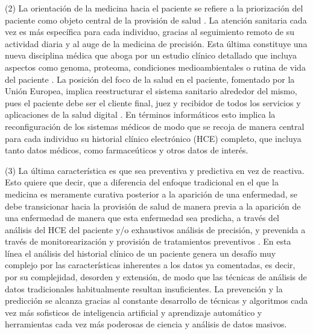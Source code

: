
(2) La orientación de la medicina hacia el paciente se refiere a la priorización del paciente como objeto central de la provisión de salud  \cite{tortorella2020healthcare}. La atención sanitaria cada vez es más específica para cada individuo, gracias al seguimiento remoto de su actividad diaria y al auge de la medicina de precisión. Esta última constituye una nueva disciplina médica que aboga por un estudio clínico detallado que incluya aspectos como genoma, proteoma, condiciones medioambientales o rutina de vida del paciente \cite{ruiz2023inteligencia}. La posición del foco de la salud en el paciente, fomentado por la Unión Europea,  implica reestructurar el sistema sanitario alrededor del mismo, pues el paciente debe ser el cliente final, juez y recibidor de todos los servicios y aplicaciones de la salud digital \cite{ntafi2022legal} \cite{katehakis2019framework}. En términos informáticos esto implica la reconfiguración de los sistemas médicos de modo que se recoja de manera central para cada individuo su historial clínico electrónico (HCE) completo, que incluya tanto datos médicos, como farmaceúticos y otros datos de interés.  



(3) La última característica es que sea preventiva y predictiva en vez de reactiva. Esto quiere que decir, que a diferencia del enfoque tradicional en el que la medicina es meramente curativa posterior a la aparición de una enfermedad, se debe transicionar hacia la provisión de salud de manera previa a la aparición de una enfermedad de manera que esta enfermedad sea predicha, a través del análisis del HCE del paciente y/o exhaustivos análisis de precisión, y prevenida a través de monitorearización y provisión de tratamientos preventivos \cite{ruiz2023inteligencia}. En esta línea el análisis del historial clínico de un paciente genera un desafío muy complejo por las características inherentes a los datos ya comentadas, es decir, por su complejidad, desorden y extensión, de modo que las técnicas de análisis de datos tradicionales habitualmente resultan insuficientes. La prevención y la predicción se alcanza gracias al constante desarrollo de técnicas y algoritmos cada vez más sofisticos de inteligencia artificial y aprendizaje automático y herramientas cada vez más poderosas de ciencia y análisis de datos masivos.



